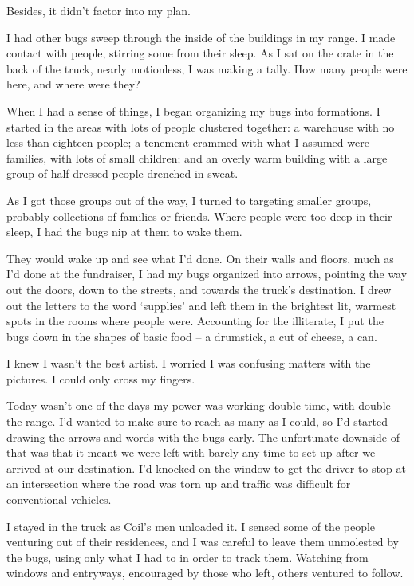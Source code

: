Besides, it didn't factor into my plan.



I had other bugs sweep through the inside of the buildings in my range.  I made contact with people, stirring some from their sleep.  As I sat on the crate in the back of the truck, nearly motionless, I was making a tally.  How many people were here, and where were they?



When I had a sense of things, I began organizing my bugs into formations.  I started in the areas with lots of people clustered together: a warehouse with no less than eighteen people; a tenement crammed with what I assumed were families, with lots of small children; and an overly warm building with a large group of half-dressed people drenched in sweat.



As I got those groups out of the way, I turned to targeting smaller groups, probably collections of families or friends.  Where people were too deep in their sleep, I had the bugs nip at them to wake them.



They would wake up and see what I'd done.  On their walls and floors, much as I'd done at the fundraiser, I had my bugs organized into arrows, pointing the way out the doors, down to the streets, and towards the truck's destination.  I drew out the letters to the word `supplies' and left them in the brightest lit, warmest spots in the rooms where people were.  Accounting for the illiterate, I put the bugs down in the shapes of basic food – a drumstick, a cut of cheese, a can.



I knew I wasn't the best artist.  I worried I was confusing matters with the pictures.  I could only cross my fingers.



Today wasn't one of the days my power was working double time, with double the range.  I'd wanted to make sure to reach as many as I could, so I'd started drawing the arrows and words with the bugs early.  The unfortunate downside of that was that it meant we were left with barely any time to set up after we arrived at our destination.  I'd knocked on the window to get the driver to stop at an intersection where the road was torn up and traffic was difficult for conventional vehicles.



I stayed in the truck as Coil's men unloaded it.  I sensed some of the people venturing out of their residences, and I was careful to leave them unmolested by the bugs, using only what I had to in order to track them.  Watching from windows and entryways, encouraged by those who left, others ventured to follow.



